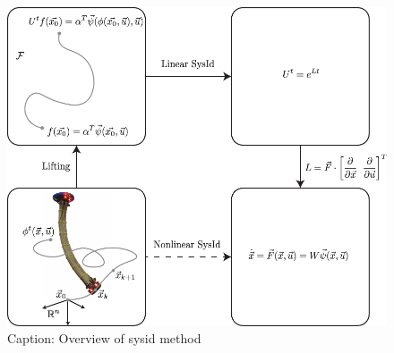\begin{figure}[t]
    \centering
    \includegraphics[width=\linewidth]{figures/overviewDiagram_rough.pdf}
    \caption{Caption: Overview of sysid method}
    \label{fig:overview}
\end{figure}

